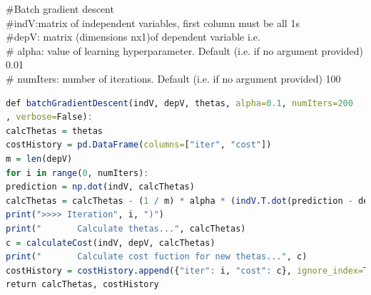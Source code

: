 \documentclass[10pt,a4paper]{article}
\begin{document}
\#Batch gradient descent\\

\#indV:matrix of independent variables, first column must be all 1s\\
\#depV: matrix (dimensions nx1)of dependent variable i.e.\\
\# alpha: value of learning hyperparameter. Default (i.e. if no argument provided)  0.01\\
\# numIters: number of iterations. Default (i.e. if no argument provided) 100\\
\begin{lstlisting}[language=R]	
def batchGradientDescent(indV, depV, thetas, alpha=0.1, numIters=200
, verbose=False):
calcThetas = thetas
costHistory = pd.DataFrame(columns=["iter", "cost"])
m = len(depV)
for i in range(0, numIters):
prediction = np.dot(indV, calcThetas)
calcThetas = calcThetas - (1 / m) * alpha * (indV.T.dot(prediction - depV))
print(">>>> Iteration", i, ")")
print("       Calculate thetas...", calcThetas)
c = calculateCost(indV, depV, calcThetas)
print("       Calculate cost fuction for new thetas...", c)
costHistory = costHistory.append({"iter": i, "cost": c}, ignore_index=True)
return calcThetas, costHistory
	
\end{lstlisting}	
	
\end{document}
